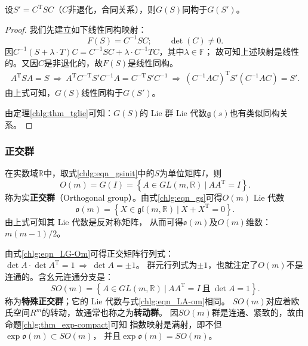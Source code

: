 \begin{proposition}
    设$S'= C^{\mathrm{T}} S C $（$C$非退化，合同关系），则$G(S)$同构于$G(S')$。
\end{proposition}
\begin{proof}
    我们先建立如下线性同构映射：
    \begin{equation}
        F(S)=C^{-1}SC;\qquad \det(C)\neq 0.
    \end{equation}
    因$C^{-1}(S+\lambda \cdot T)C= C^{-1}SC +\lambda \cdot C^{-1}TC $，其中$\lambda\in \mathbb{F}$；
    故可知上述映射是线性的。又因$C$是非退化的，故$F(S)$是线性同构。
    \begin{align*}
        A^{\mathrm{T}} S A = S \ \Rightarrow\ A^{\mathrm{T}} C^{-\mathrm{T}}S' C^{-1} A = C^{-\mathrm{T}}S' C^{-1}
        \ \Rightarrow\ (C^{-1} A C)^{\mathrm{T}} S' (C^{-1} A C) = S'  .
    \end{align*}
    由上式可知，$G(S)$线性同构于$G(S')$。

    由定理\ref{chlg:thm_tglie}可知：$G(S)$的 Lie 群 Lie 代数$\mathfrak{g}(s)$也有类似同构关系。
\end{proof}

\subsubsection{正交群}\label{chlg:sec_Orthogonal}
在实数域$\mathbb{R}$中，取式\eqref{chlg:eqn_gsinit}中的$S$为单位矩阵$I$，则
\begin{equation}\label{chlg:eqn_LG-Om}
    O(m) = G(I)= \left\{ A \in GL(m,\mathbb{R})\ |\ A A^{\mathrm{T}} =I \right\}.
\end{equation}
称为实\textbf{正交群}（Orthogonal group）。由式\eqref{chlg:eqn_gs}可得$O(m)$ Lie 代数
\begin{equation}\label{chlg:eqn_LA-om}
    \mathfrak{o}(m) = \left\{ X \in \mathfrak{gl}(m,\mathbb{R}) \ | \
    X  +  X^{\mathrm{T}} = 0 \right\} .
\end{equation}
由上式可知其 Lie 代数是反对称矩阵，
从而可得$\mathfrak{o}(m)$及$O(m)$维数：$m(m-1)/2$。

由式\eqref{chlg:eqn_LG-Om}可得正交矩阵行列式：
$\det A \cdot \det A^{\mathrm{T}} = 1 \ \Rightarrow \ \det A = \pm 1$。
群元行列式为$\pm 1$，也就注定了$O(m)$不是连通的。含幺元连通分支是：
\begin{equation}
    SO(m)
    = \left\{ A \in GL(m,\mathbb{R})\ |\ A A^{\mathrm{T}} =I
    \ \text{且}\ \det A = 1 \right\} .
\end{equation}
称为\textbf{特殊正交群}；它的 Lie 代数与式\eqref{chlg:eqn_LA-om}相同。
$SO(m)$对应着欧氏空间$R^m$的转动，故通常也称之为\textbf{转动群}。
因$SO(m)$群是连通、紧致的，故由命题\ref{chlg:thm_exp-compact}可知
指数映射是满射，即不但$\exp \mathfrak{o}(m) \subset SO(m)$，
并且$\exp \mathfrak{o}(m) = SO(m)$。

